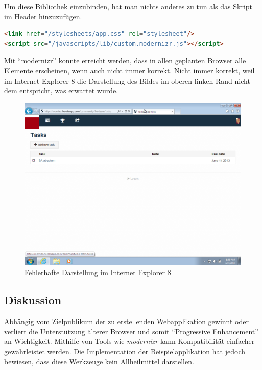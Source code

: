 Um diese Bibliothek einzubinden, hat man nichts anderes zu tun als das Skript im Header hinzuzufügen.

\begin{lstlisting}[language=HTML, caption=Einbinden von modernizr \cite{roomiesLayout}, firstnumber=11, label=lst:mdernizrLayoutServer]
<link href="/stylesheets/app.css" rel="stylesheet"/>
<script src="/javascripts/lib/custom.modernizr.js"></script>
\end{lstlisting}

Mit ``modernizr'' konnte erreicht werden, dass in allen geplanten Browser alle Elemente erscheinen, wenn auch nicht immer korrekt. Nicht immer korrekt, weil im Internet Explorer 8 die Darstellung des Bildes im oberen linken Rand nicht dem entspricht, was erwartet wurde.

\begin{figure}[H]
	\centering
	\includegraphics[width=12cm]{content/principle-demonstration/images/progressive-enhancement-ie8.png}
	\caption{Fehlerhafte Darstellung im Internet Explorer 8}
	\label{fig:iossafari-datepicker}
\end{figure}

\subsection*{Diskussion}
Abhängig vom Zielpublikum der zu erstellenden Webapplikation gewinnt oder verliert die Unterstützung älterer Browser und somit ``Progressive Enhancement'' an Wichtigkeit. Mithilfe von Tools wie \emph{modernizr} kann Kompatibilität einfacher gewährleistet werden. Die Implementation der Beispielapplikation hat jedoch bewiesen, dass diese Werkzeuge kein Allheilmittel darstellen.

